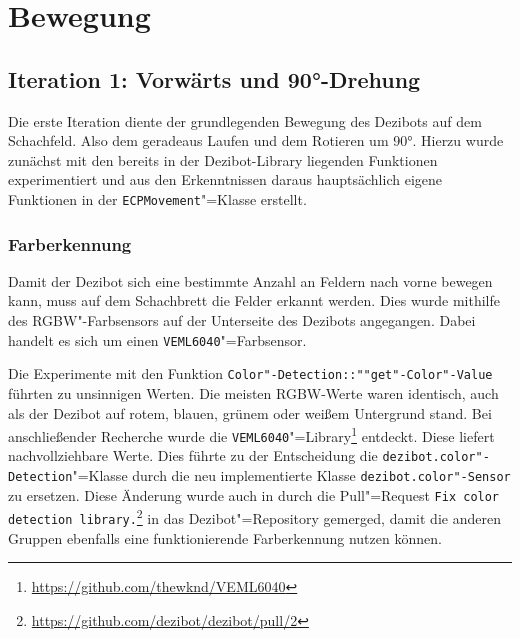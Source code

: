 
\section{Bewegung}
\label{sec:movement}

\subsection{Iteration 1: Vorwärts und 90°-Drehung}
\label{sec:move-straight-turn}

Die erste Iteration diente der grundlegenden Bewegung des Dezibots auf dem Schachfeld. Also dem geradeaus Laufen und dem Rotieren um 90°. Hierzu wurde zunächst mit den bereits in der Dezibot-Library liegenden Funktionen experimentiert und aus den Erkenntnissen daraus hauptsächlich eigene Funktionen in der \texttt{ECPMovement}"=Klasse erstellt. 

\subsubsection{Farberkennung}
\label{sec:color-detection}

Damit der Dezibot sich eine bestimmte Anzahl an Feldern nach vorne bewegen kann, muss auf dem Schachbrett die Felder erkannt werden. Dies wurde mithilfe des RGBW"-Farbsensors auf der Unterseite des Dezibots angegangen. Dabei handelt es sich um einen \texttt{VEML6040}"=Farbsensor.

Die Experimente mit den Funktion \texttt{Color"-Detection::""get"-Color"-Value} führten zu unsinnigen Werten. Die meisten RGBW-Werte waren identisch, auch als der Dezibot auf rotem, blauen, grünem oder weißem Untergrund stand. Bei anschließender Recherche wurde die \texttt{VEML6040}"=Library\footnote{\url{https://github.com/thewknd/VEML6040}} entdeckt. Diese liefert nachvollziehbare Werte. Dies führte zu der Entscheidung die \texttt{dezibot.color"-Detection}"=Klasse durch die neu implementierte Klasse \texttt{dezibot.color"-Sensor} zu ersetzen. Diese Änderung wurde auch in durch die Pull"=Request \texttt{Fix color detection library.}\footnote{\url{https://github.com/dezibot/dezibot/pull/2}} in das Dezibot"=Repository gemerged, damit die anderen Gruppen ebenfalls eine funktionierende Farberkennung nutzen können.

